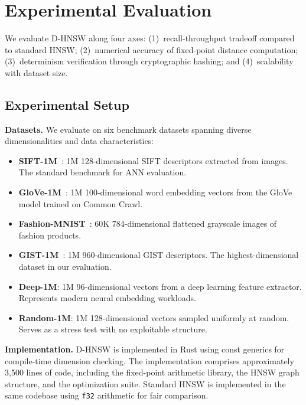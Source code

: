 \documentclass[10pt,journal,compsoc]{IEEEtran}
\newcommand{\dhnsw}{\textsc{D-HNSW}}
\newcommand{\hnsw}{\textsc{HNSW}}
\begin{document}
\section{Experimental Evaluation}
\label{sec:experiments}

We evaluate \dhnsw{} along four axes: (1)~recall-throughput tradeoff compared to standard \hnsw{}; (2)~numerical accuracy of fixed-point distance computation; (3)~determinism verification through cryptographic hashing; and (4)~scalability with dataset size.

\subsection{Experimental Setup}

\textbf{Datasets.} We evaluate on six benchmark datasets spanning diverse dimensionalities and data characteristics:

\begin{itemize}[leftmargin=*]
  \item \textbf{SIFT-1M}~\cite{jegou2011sift}: 1M 128-dimensional SIFT descriptors extracted from images. The standard benchmark for ANN evaluation.
  \item \textbf{GloVe-1M}~\cite{pennington2014glove}: 1M 100-dimensional word embedding vectors from the GloVe model trained on Common Crawl.
  \item \textbf{Fashion-MNIST}~\cite{xiao2017fashion}: 60K 784-dimensional flattened grayscale images of fashion products.
  \item \textbf{GIST-1M}~\cite{oliva2001gist}: 1M 960-dimensional GIST descriptors. The highest-dimensional dataset in our evaluation.
  \item \textbf{Deep-1M}: 1M 96-dimensional vectors from a deep learning feature extractor. Represents modern neural embedding workloads.
  \item \textbf{Random-1M}: 1M 128-dimensional vectors sampled uniformly at random. Serves as a stress test with no exploitable structure.
\end{itemize}

\textbf{Implementation.} \dhnsw{} is implemented in Rust using const generics for compile-time dimension checking. The implementation comprises approximately 3{,}500 lines of code, including the fixed-point arithmetic library, the \hnsw{} graph structure, and the optimization suite. Standard \hnsw{} is implemented in the same codebase using \texttt{f32} arithmetic for fair comparison.
\end{document}
